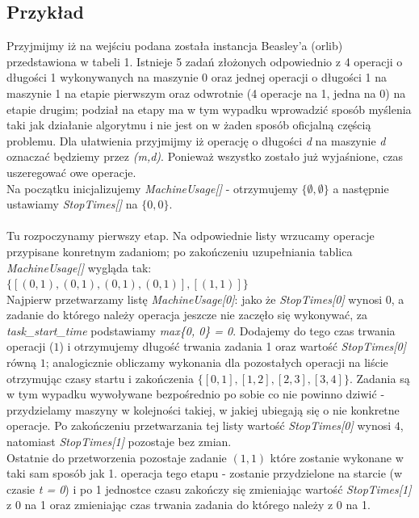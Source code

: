 \documentclass[a4paper,11pt]{article}
\begin{document}
\subsection{Przykład}
Przyjmijmy iż na wejściu podana została instancja Beasley'a (orlib) przedstawiona w tabeli 1. Istnieje 5 zadań złożonych odpowiednio z 4 operacji o długości 1 wykonywanych na maszynie 0 oraz jednej operacji o długości 1 na maszynie 1 na etapie pierwszym oraz odwrotnie (4 operacje na 1, jedna na 0) na etapie drugim; podział na etapy ma w tym wypadku wprowadzić sposób myślenia taki jak działanie algorytmu i nie jest on w żaden sposób oficjalną częścią problemu. Dla ułatwienia przyjmijmy iż operację o długości \emph{d} na maszynie \emph{d} oznaczać będziemy przez \emph{(m,d)}. Ponieważ wszystko zostało już wyjaśnione, czas uszeregować owe operacje.\\
Na początku inicjalizujemy \emph{MachineUsage[]} - otrzymujemy $\{\emptyset, \emptyset\}$ a następnie ustawiamy \emph{StopTimes[]} na $\{0, 0\}$.\\\\
Tu rozpoczynamy pierwszy etap. Na odpowiednie listy wrzucamy operacje przypisane konretnym zadaniom; po zakończeniu uzupełniania tablica \emph{MachineUsage[]} wygląda tak:\\$\{[(0,1),(0,1),(0,1),(0,1)],[(1,1)]\}$\\
Najpierw przetwarzamy listę \emph{MachineUsage[0]}: jako że \emph{StopTimes[0]} wynosi $0$, a zadanie do którego należy operacja jeszcze nie zaczęło się wykonywać, za \emph{task\_start\_time} podstawiamy \emph{max\{0, 0\} = 0}. Dodajemy do tego czas trwania operacji ($1$) i otrzymujemy długość trwania zadania 1 oraz wartość \emph{StopTimes[0]} równą $1$; analogicznie obliczamy wykonania dla pozostałych operacji na liście otrzymując czasy startu i zakończenia $\{[0,1],[1,2],[2,3],[3,4]\}$. Zadania są w tym wypadku wywoływane bezpośrednio po sobie co nie powinno dziwić - przydzielamy maszyny w kolejności takiej, w jakiej ubiegają się o nie konkretne operacje. Po zakończeniu przetwarzania tej listy wartość \emph{StopTimes[0]} wynosi $4$, natomiast \emph{StopTimes[1]} pozostaje bez zmian.\\
Ostatnie do przetworzenia pozostaje zadanie $(1,1)$ które zostanie wykonane w taki sam sposób jak 1. operacja tego etapu - zostanie przydzielone na starcie (w czasie \emph{t = 0}) i po 1 jednostce czasu zakończy się zmieniając wartość \emph{StopTimes[1]} z 0 na 1 oraz zmieniając czas trwania zadania do którego należy z 0 na 1.\\\\
\end{document}

